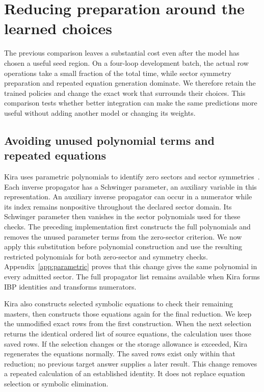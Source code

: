 \section{Reducing preparation around the learned choices}
\label{sec:parametric}
The previous comparison leaves a substantial cost even after the model has chosen a useful seed region. On a four-loop development batch, the actual row operations take a small fraction of the total time, while sector symmetry preparation and repeated equation generation dominate. We therefore retain the trained policies and change the exact work that surrounds their choices. This comparison tests whether better integration can make the same predictions more useful without adding another model or changing its weights.

\subsection{Avoiding unused polynomial terms and repeated equations}
Kira uses parametric polynomials to identify zero sectors and sector symmetries~\cite{KiraOriginal,Lee2014LiteRed}. Each inverse propagator has a Schwinger parameter, an auxiliary variable in this representation. An auxiliary inverse propagator can occur in a numerator while its index remains nonpositive throughout the declared sector domain. Its Schwinger parameter then vanishes in the sector polynomials used for these checks. The preceding implementation first constructs the full polynomials and removes the unused parameter terms from the zero-sector criterion. We now apply this substitution before polynomial construction and use the resulting restricted polynomials for both zero-sector and symmetry checks. Appendix~\ref{app:parametric} proves that this change gives the same polynomial in every admitted sector. The full propagator list remains available when Kira forms IBP identities and transforms numerators.

Kira also constructs selected symbolic equations to check their remaining masters, then constructs those equations again for the final reduction. We keep the unmodified exact rows from the first construction. When the next selection returns the identical ordered list of source equations, the calculation uses those saved rows. If the selection changes or the storage allowance is exceeded, Kira regenerates the equations normally. The saved rows exist only within that reduction; no previous target answer supplies a later result. This change removes a repeated calculation of an established identity. It does not replace equation selection or symbolic elimination.

